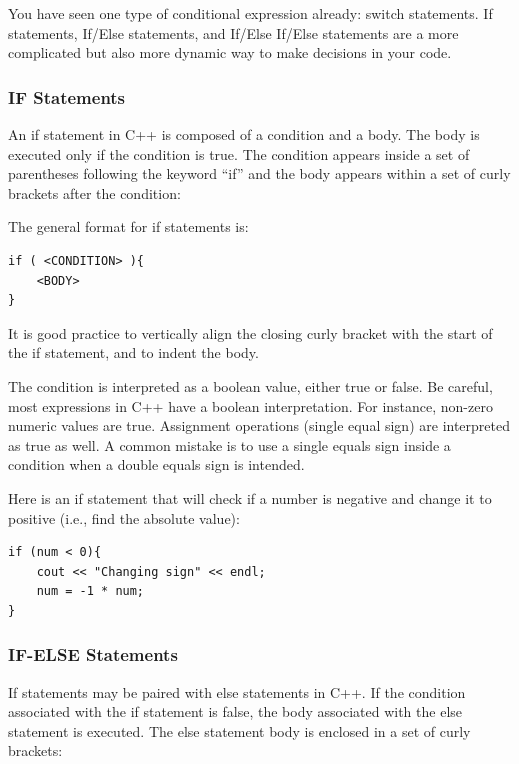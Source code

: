 You have seen one type of conditional expression already: switch statements. If statements, If/Else statements, and If/Else If/Else statements are a more complicated but also more dynamic way to make decisions in your code.

\subsubsection{IF Statements} 

An if statement in C++ is composed of a condition and a body. The body is executed only if the condition is true. The condition appears inside a set of parentheses following the keyword “if” and the body appears within a set of curly brackets after the condition:

The general format for if statements is:

\begin{verbatim}
if ( <CONDITION> ){
	<BODY>
}    
\end{verbatim}

It is good practice to vertically align the closing curly bracket with the start of the if statement, and to indent the body.

The condition is interpreted as a boolean value, either true or false. Be careful, most expressions in C++ have a boolean interpretation. For instance, non-zero numeric values are true. Assignment operations (single equal sign) are interpreted as true as well. A common mistake is to use a single equals sign inside a condition when a double equals sign is intended.

\begin{example}
    Here is an if statement that will check if a number is negative and change it to positive (i.e., find the absolute value):

    \begin{verbatim}
if (num < 0){
	cout << "Changing sign" << endl;
	num = -1 * num;
}
    \end{verbatim}
\end{example}

\subsubsection{IF-ELSE Statements}
 If statements may be paired with else statements in C++. If the condition associated with the if statement is false, the body associated with the else statement is executed. The else statement body is enclosed in a set of curly brackets:

